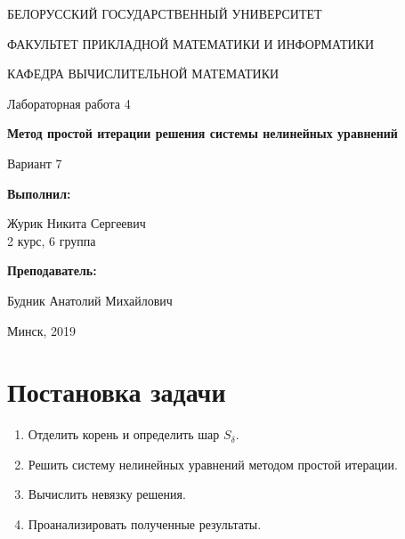 \documentclass[14pt, a4paper]{article}
\begin{document}
\begin{titlepage}
\begin{center}
\large{БЕЛОРУССКИЙ ГОСУДАРСТВЕННЫЙ УНИВЕРСИТЕТ 

ФАКУЛЬТЕТ ПРИКЛАДНОЙ МАТЕМАТИКИ И ИНФОРМАТИКИ

КАФЕДРА ВЫЧИСЛИТЕЛЬНОЙ МАТЕМАТИКИ}
\end{center}
\vspace*{\fill}
\begin{center}
Лабораторная работа 4

\large{\textbf{Метод простой итерации решения системы нелинейных уравнений}}

Вариант 7
\end{center}
\begin{flushright}
\textbf{Выполнил:}

Журик Никита Сергеевич \\ 2 курс, 6 группа

\textbf{Преподаватель:}

Будник Анатолий Михайлович
\end{flushright}
\vspace*{\fill}
\begin{center}
Минск, 2019
\end{center}
\end{titlepage}

\tableofcontents
\newpage

\newpage
{}

  \section{Постановка задачи}
    \begin{enumerate}
      \item
      Отделить корень и определить шар $S_{\delta}$.
      \item
      Решить систему нелинейных уравнений методом простой итерации.
      \item
      Вычислить невязку решения.
      \item
      Проанализировать полученные результаты.
    \end{enumerate}
\end{document}
